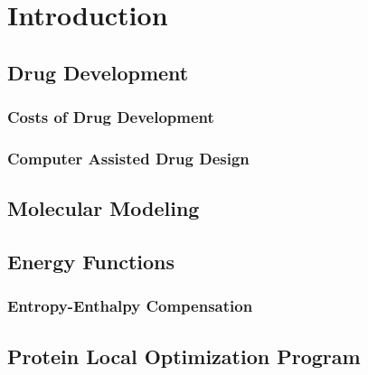 \chapter{Introduction}
\label{chapter:intro}

\section{Drug Development}
\label{section:drug_development}

\subsection{Costs of Drug Development}
\label{subsection:costs_of_drug_development}


\subsection{Computer Assisted Drug Design}
\label{subsection:computer_assisted_drug_design}


\section{Molecular Modeling}
\label{section:molecular_modeling}


\section{Energy Functions}
\label{section:energy_functions}

\subsection{Entropy-Enthalpy Compensation}
\label{subsection:entropy_enthalpy}

\section{Protein Local Optimization Program}
\label{section:protein_local_optimization_program}

